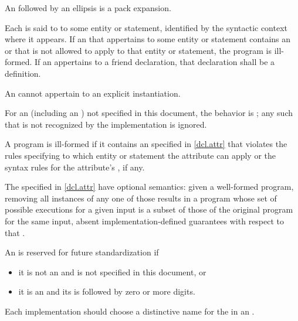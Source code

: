 \pnum
An  followed by an ellipsis
is a pack expansion.

\pnum
Each  is said to  to some entity or
statement, identified by the syntactic context
where it appears.
If an  that appertains to some
entity or statement contains an  or  that
is not allowed to apply to that
entity or statement, the program is ill-formed. If an 
appertains to a friend declaration, that declaration shall be a
definition.
\begin{note}
An  cannot appertain to
an explicit instantiation.
\end{note}

\pnum
For an 
(including an )
not specified in this document, the
behavior is ;
any such  that is not recognized by the implementation
is ignored.
\begin{note}
A program is ill-formed if it contains an 
specified in \ref{dcl.attr} that violates
the rules specifying to which entity or statement the attribute can apply or
the syntax rules for the attribute's , if any.
\end{note}
\begin{note}
The  specified in \ref{dcl.attr}
have optional semantics:
given a well-formed program,
removing all instances of any one of those 
results in a program whose set of possible executions
for a given input is
a subset of those of the original program for the same input,
absent implementation-defined guarantees
with respect to that .
\end{note}
An  is reserved for future standardization if
\begin{itemize}
\item it is not an  and
is not specified in this document, or
\item it is an  and
its  is
 followed by zero or more digits.
\end{itemize}
Each implementation should choose a distinctive name for the
 in an .

